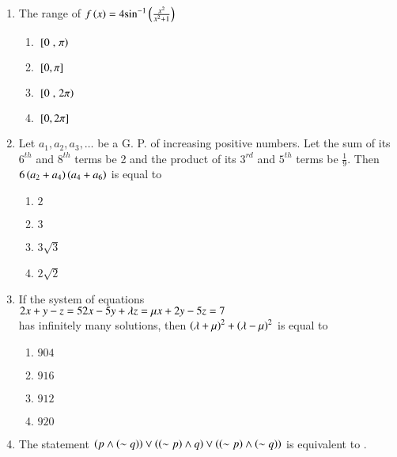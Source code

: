 \documentclass[journal]{IEEEtran}
\theoremstyle{remark}
\begin{document}
\begin{enumerate}
\item The range of $f\left(x\right)=4{\sin}^{-1}\left(\frac{x^2}{x^2+1}\right)$

\begin{multicols}{4}
\begin{enumerate}
\item ${}\left[0\right.,\left.\pi\right)$
\item ${}\left[0,\pi\right]$
\item ${}\left[0\right.,\left.2\pi\right)$
\item ${}\left[0,2\pi\right]$
\end{enumerate}
\end{multicols}

\item Let $a_1, a_2, a_3, \dots$ be a G. P. of increasing positive numbers. Let the sum of its $6^{th}$ and $8^{th}$ terms be 2 and the product of its $3^{rd}$ and $5^{th}$ terms be $\frac{1}{9}$. Then $6\left(a_2 + a_4\right)\left( a_4 + a_6\right)$ is equal to

\begin{multicols}{4}
\begin{enumerate}
\item $2$
\item $3$
\item $3\sqrt{3}$
\item $2\sqrt{2}$
\end{enumerate}
\end{multicols}

\item If the system of equations\\
$2x+y -z=5\\
2x-5y+\lambda z=\mu\\
x+2y-5z=7$\\
has infinitely many solutions, then ${\left(\lambda+\mu\right)}^2+{\left(\lambda-\mu\right)}^2$ is equal to

\begin{multicols}{4}
\begin{enumerate}
\item $904$
\item $916$
\item $912$
\item $920$
\end{enumerate}
\end{multicols}

\item The statement $\left(p\land\left(\sim q\right)\right)\lor\left(\left(\sim p\right)\land q\right)\lor\left(\left(\sim p\right)\land \left(\sim q\right)\right)$ is equivalent to .


\end{enumerate}
\end{document}
